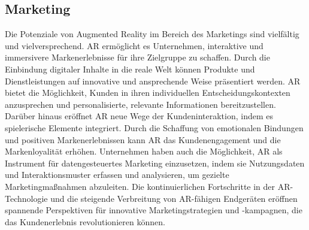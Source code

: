 \subsection{Marketing}
Die Potenziale von Augmented Reality im Bereich des Marketings sind
vielfältig und vielversprechend. AR ermöglicht es Unternehmen, interaktive und
immersivere Markenerlebnisse für ihre Zielgruppe zu schaffen. Durch die
Einbindung digitaler Inhalte in die reale Welt können Produkte und
Dienstleistungen auf innovative und ansprechende Weise präsentiert werden. AR
bietet die Möglichkeit, Kunden in ihren individuellen Entscheidungskontexten
anzusprechen und personalisierte, relevante Informationen bereitzustellen.
Darüber hinaus eröffnet AR neue Wege der Kundeninteraktion, indem es
spielerische Elemente integriert. Durch die Schaffung von emotionalen Bindungen
und positiven Markenerlebnissen kann AR das Kundenengagement und die
Markenloyalität erhöhen. Unternehmen haben auch die Möglichkeit, AR als
Instrument für datengesteuertes Marketing einzusetzen, indem sie Nutzungsdaten
und Interaktionsmuster erfassen und analysieren, um gezielte Marketingmaßnahmen
abzuleiten. Die kontinuierlichen Fortschritte in der AR-Technologie und die
steigende Verbreitung von AR-fähigen Endgeräten eröffnen spannende Perspektiven
für innovative Marketingstrategien und -kampagnen, die das Kundenerlebnis
revolutionieren können. \cite{chylinski2020augmented,rauschnabel2019augmented}


